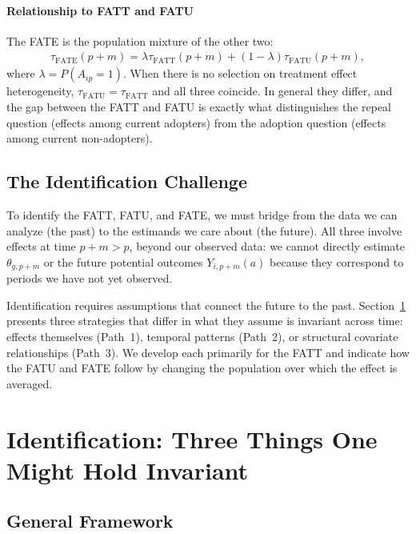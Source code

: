 \documentclass{article}
\begin{document}
\paragraph{Relationship to FATT and FATU}

The FATE is the population mixture of the other two:
\begin{align}
\tau_{\text{FATE}}(p+m) = \lambda \tau_{\text{FATT}}(p+m) + (1-\lambda) \tau_{\text{FATU}}(p+m),
\label{eq:fate-decomposition}
\end{align}
where $\lambda = P(A_{ip} = 1)$. When there is no selection on treatment effect heterogeneity, $\tau_{\text{FATU}} = \tau_{\text{FATT}}$ and all three coincide. In general they differ, and the gap between the FATT and FATU is exactly what distinguishes the repeal question (effects among current adopters) from the adoption question (effects among current non-adopters).

\subsection{The Identification Challenge}

To identify the FATT, FATU, and FATE, we must bridge from the data we can analyze (the past) to the estimands we care about (the future). All three involve effects at time $p+m > p$, beyond our observed data: we cannot directly estimate $\theta_{g,p+m}$ or the future potential outcomes $Y_{i,p+m}(a)$ because they correspond to periods we have not yet observed.

Identification requires assumptions that connect the future to the past. Section~\ref{sec:identification} presents three strategies that differ in what they assume is invariant across time: effects themselves (Path~1), temporal patterns (Path~2), or structural covariate relationships (Path~3). We develop each primarily for the FATT and indicate how the FATU and FATE follow by changing the population over which the effect is averaged.


\section{Identification: Three Things One Might Hold Invariant}
\label{sec:identification}


\subsection{General Framework}
\end{document}
